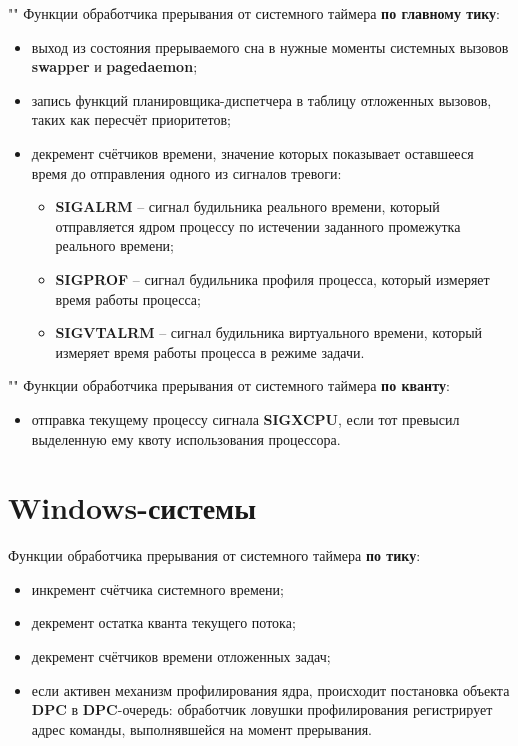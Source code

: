\documentclass[a4paper,12pt]{extreport}
\begin{document}
""\newline
Функции обработчика прерывания от системного таймера \textbf{по главному тику}:
\begin{itemize}
	\item выход из состояния прерываемого сна в нужные моменты системных вызовов \textbf{swapper} и \textbf{pagedaemon};
	\item запись функций планировщика-диспетчера в таблицу отложенных вызовов, таких как пересчёт приоритетов;
	\item декремент счётчиков времени, значение которых показывает оставшееся время до отправления одного из сигналов тревоги:
	\begin{itemize}
		\item \textbf{SIGALRM} -- сигнал будильника реального времени, который отправляется ядром процессу по истечении заданного промежутка реального времени;
		\item \textbf{SIGPROF} -- сигнал будильника профиля процесса, который измеряет время работы процесса;
		\item \textbf{SIGVTALRM} -- сигнал будильника виртуального времени, который измеряет время работы процесса в режиме задачи.
	\end{itemize} 
\end{itemize}

""\newline
Функции обработчика прерывания от системного таймера \textbf{по кванту}:
\begin{itemize}
	\item отправка текущему процессу сигнала \textbf{SIGXCPU}, если тот превысил выделенную ему квоту использования процессора.
\end{itemize}

\section{Windows-системы}

\noindent Функции обработчика прерывания от системного таймера \textbf{по тику}:
\begin{itemize}
	\item инкремент счётчика системного времени;
	\item декремент остатка кванта текущего потока;
	\item декремент счётчиков времени отложенных задач;
	\item если активен механизм профилирования ядра, происходит постановка объекта \textbf{DPC} в \textbf{DPC}-очередь: обработчик ловушки профилирования регистрирует адрес команды, выполнявшейся на момент прерывания.
\end{itemize}
\end{document}
